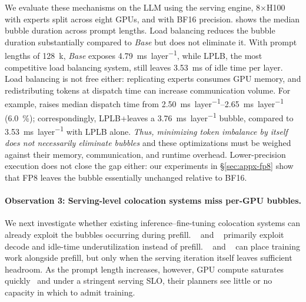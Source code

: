 We evaluate these mechanisms on the \deepseekmoe \ac{LLM} using the \sglang serving engine, 8$\times$H100 with experts split across eight GPUs, and with BF16 precision.
 shows the median bubble duration across prompt lengths.
Load balancing reduces the bubble duration substantially compared to \emph{Base} but does not eliminate it.
With prompt lengths of \SI{128}{k}, \emph{Base} exposes \SI{4.79}{\milli\second\per layer}, while \ac{LPLB}, the most competitive load balancing system, still leaves \SI{3.53}{\milli\second} of idle time per layer.
Load balancing is not free either: replicating experts consumes GPU memory, and redistributing tokens at dispatch time can increase communication volume.
For example, \waterfill raises median dispatch time from \SIrange{2.50}{2.65}{\milli\second\per layer} (\SI{6.0}{\percent}); correspondingly, \ac{LPLB}+\waterfill leaves a \SI{3.76}{\milli\second\per layer} bubble, compared to \SI{3.53}{\milli\second\per layer} with \ac{LPLB} alone.
\emph{Thus, minimizing token imbalance by itself does not necessarily eliminate bubbles} and these optimizations must
be weighed against their memory, communication, and runtime overhead.
Lower-precision execution does not close the gap either: our experiments in \S\ref{sec:appx-fp8} show that FP8 leaves the bubble essentially unchanged relative to BF16.

\paragraph{Observation 3: Serving-level colocation systems miss per-GPU bubbles.}
\label{sec:gap}
We next investigate whether existing inference--fine-tuning colocation systems can already exploit the bubbles occurring during prefill.
\llmstation~\cite{llmstation} and \harli~\cite{harli} primarily exploit decode and idle-time underutilization instead of prefill.
\flexllm~\cite{flexllm} and \deltaserve~\cite{deltaserve} can place training work alongside prefill, but only when the serving iteration itself leaves sufficient headroom.
As the prompt length increases, however, GPU compute saturates quickly~\cite{sarathi} and under a stringent serving \ac{SLO}, their planners see little or no capacity in which to admit training.

